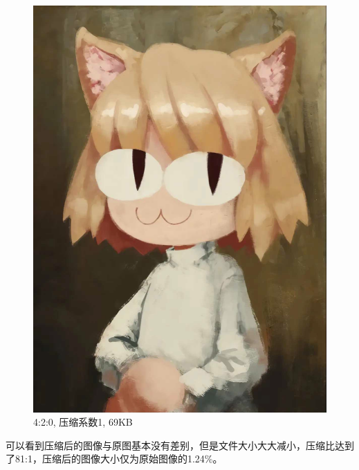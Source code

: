 \documentclass{article}
\begin{document}
\begin{figure}[htbp]
\begin{minipage}[t]{0.45\textwidth}
        \includegraphics[width=\textwidth]{assets/Test1_420.png}
        \caption{4:2:0, 压缩系数1, 69KB}
    \end{minipage}
\end{figure}
\FloatBarrier
可以看到压缩后的图像与原图基本没有差别，但是文件大小大大减小，压缩比达到了81:1，压缩后的图像大小仅为原始图像的1.24\%。
\end{document}
